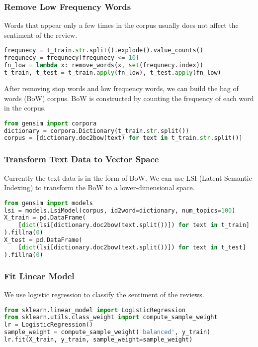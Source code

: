 \documentclass[beamer, en, version=2.0]{huangfusl-template}
\begin{document}
    \begin{frame}[fragile]
        \frametitle{Remove Low Frequency Words}

        Words that appear only a few times in the corpus usually does not affect the sentiment of the review.

\begin{lstlisting}[language=python, breaklines]
frequnecy = t_train.str.split().explode().value_counts()
frequnecy = frequnecy[frequnecy <= 10]
fn_low = lambda x: remove_words(x, set(frequnecy.index))
t_train, t_test = t_train.apply(fn_low), t_test.apply(fn_low)
\end{lstlisting}

        After removing stop words and low frequency words, we can build the bag of words (BoW) corpus. BoW is constructed by counting the frequency of each word in the corpus.

\begin{lstlisting}[language=python, breaklines]
from gensim import corpora
dictionary = corpora.Dictionary(t_train.str.split())
corpus = [dictionary.doc2bow(text) for text in t_train.str.split()]
\end{lstlisting}

    \end{frame}

    \begin{frame}[fragile]
        \frametitle{Transform Text Data to Vector Space}

        Currently the text data is in the form of BoW. We can use LSI (Latent Semantic Indexing) to transform the BoW to a lower-dimensional space.

\begin{lstlisting}[language=python, breaklines]
from gensim import models
lsi = models.LsiModel(corpus, id2word=dictionary, num_topics=100)
X_train = pd.DataFrame(
    [dict(lsi[dictionary.doc2bow(text.split())]) for text in t_train]
).fillna(0)
X_test = pd.DataFrame(
    [dict(lsi[dictionary.doc2bow(text.split())]) for text in t_test]
).fillna(0)
\end{lstlisting}

    \end{frame}

    \begin{frame}[fragile]
        \frametitle{Fit Linear Model}

        We use logistic regression to classify the sentiment of the reviews.

\begin{lstlisting}[language=python, breaklines]
from sklearn.linear_model import LogisticRegression
from sklearn.utils.class_weight import compute_sample_weight
lr = LogisticRegression()
sample_weight = compute_sample_weight('balanced', y_train)
lr.fit(X_train, y_train, sample_weight=sample_weight)
\end{lstlisting}
    \end{frame}
\end{document}
